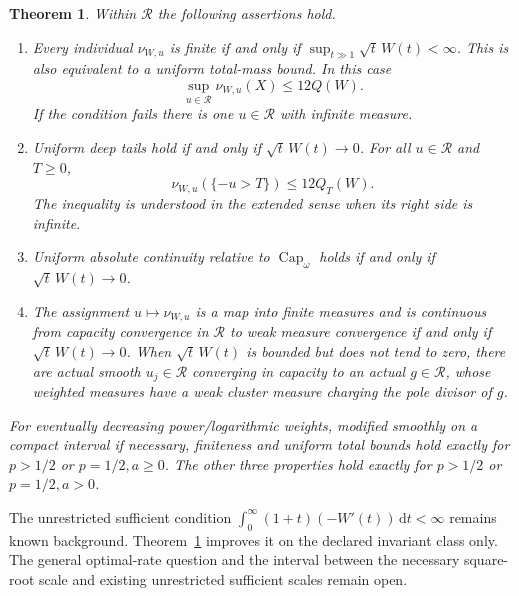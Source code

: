 \documentclass[11pt]{article}
\newtheorem{theorem}{Theorem}
\theoremstyle{remark}
\begin{document}
\begin{theorem}\label{thm:sharp}
Within $\mathcal R$ the following assertions hold.
\begin{enumerate}
\item Every individual $\nu_{W,u}$ is finite if and only if
$\sup_{t\gg1}\sqrt t\,W(t)<\infty$. This is also equivalent to a uniform
total-mass bound. In this case
\[
 \sup_{u\in\mathcal R}\nu_{W,u}(X)\leq12Q(W).
\]
If the condition fails there is one $u\in\mathcal R$ with infinite measure.
\item Uniform deep tails hold if and only if $\sqrt t\,W(t)\to0$.
For all $u\in\mathcal R$ and $T\geq0$,
\[
 \nu_{W,u}(\{-u>T\})\leq12Q_T(W).
\]
The inequality is understood in the extended sense when its right side
is infinite.
\item Uniform absolute continuity relative to $\operatorname{Cap}_\omega$
holds if and only if $\sqrt t\,W(t)\to0$.
\item The assignment $u\mapsto\nu_{W,u}$ is a map into finite measures
and is continuous from capacity convergence in $\mathcal R$ to weak
measure convergence if and only if $\sqrt t\,W(t)\to0$.
When $\sqrt t\,W(t)$ is bounded but does not tend to zero, there are
actual smooth $u_j\in\mathcal R$ converging in capacity to an actual
$g\in\mathcal R$, whose weighted measures have a weak cluster measure
charging the pole divisor of $g$.
\end{enumerate}
For eventually decreasing power/logarithmic weights, modified smoothly
on a compact interval if necessary, finiteness and uniform total bounds
hold exactly for $p>1/2$ or $p=1/2,a\geq0$. The other three properties
hold exactly for $p>1/2$ or $p=1/2,a>0$.
\end{theorem}

The unrestricted sufficient condition
$\int_0^\infty(1+t)(-W'(t))\,\mathrm dt<\infty$ remains known background.
Theorem~\ref{thm:sharp} improves it on the declared invariant class only.
The general optimal-rate question and the interval between the necessary
square-root scale and existing unrestricted sufficient scales remain open.
\end{document}
